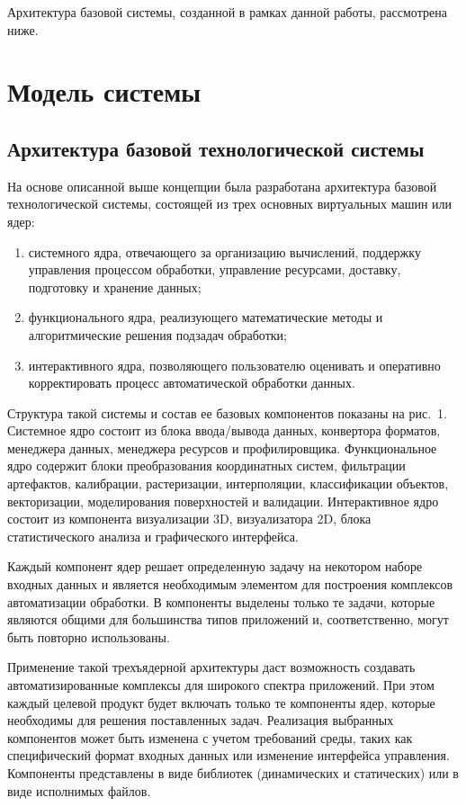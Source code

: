 \begin{multicols}{2}
   Архитектура базовой системы, созданной в рамках данной работы, 
рассмотрена ниже.
   
\section{Модель системы}

\subsection{Архитектура базовой технологической системы}
   
   На основе описанной выше концепции была разработана архитектура 
базовой технологической системы, состоящей из трех основных виртуальных 
машин или ядер:
   \begin{enumerate}[(1)]
\item системного ядра, отвечающего за организацию вычислений, поддержку 
управления процессом обработки, управление ресурсами, доставку, подготовку 
и хранение данных;
\item функционального ядра, реализующего математические методы и 
алгоритмические решения подзадач обработки;
\item интерактивного ядра, позволяющего пользователю оценивать и 
оперативно корректировать процесс автоматической обработки данных.
   \end{enumerate}
   
   Структура такой системы и состав ее базовых компонентов показаны на 
рис.~1. Системное ядро состоит из блока ввода/вывода данных, 
конвертора форматов, менеджера данных, менеджера ресурсов и 
профилировщика. Функциональное ядро содержит блоки преобразования 
координатных систем, фильтрации артефактов, калибрации, растеризации, 
интерполяции, классификации объектов, векторизации, моделирования 
поверхностей и валидации. Интерактивное ядро состоит из компонента %
визуализации 3D, визуализатора 2D, блока статистического анализа и 
графического интерфейса.
   
   Каждый компонент ядер решает определенную задачу на некотором наборе 
входных данных и является необходимым элементом для построения 
комплексов автоматизации обработки. В компоненты выделены только те 
задачи, которые являются общими для большинства типов приложений и, 
соответственно, могут быть повторно использованы.
   
   Применение такой трехъядерной архитектуры даст возможность создавать 
автоматизированные комплексы для широкого спектра приложений. При этом 
каждый целевой продукт будет включать только те компоненты ядер, которые 
необходимы для решения поставленных задач. Реализация выбранных 
компонентов может быть изменена с учетом требований среды, таких как 
специфический формат входных данных или изменение интерфейса 
управления. Компоненты представлены в виде библиотек (динамических и 
статических) или в виде исполнимых файлов.
   


\end{multicols}

